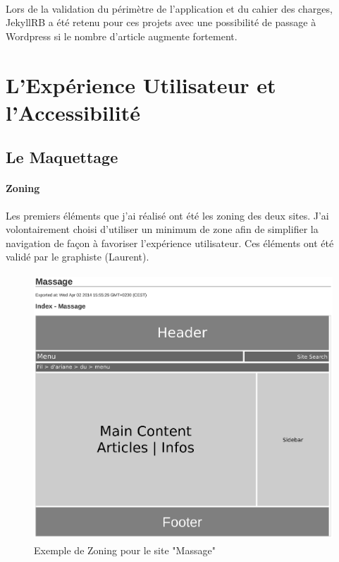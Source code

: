 \documentclass[11pt,a4paper]{report}
\begin{document}
		\paragraph*{}Lors de la validation du périmètre de l'application et du cahier des charges, JekyllRB a été retenu pour ces projets avec une possibilité de passage à Wordpress si le nombre d'article augmente fortement.
		\newpage

	\section{L'Expérience Utilisateur et l'Accessibilité}
		\subsection{Le Maquettage}
			\paragraph*{Zoning}Les premiers éléments que j'ai réalisé ont été les zoning des deux sites. J'ai volontairement choisi d'utiliser un minimum de zone afin de simplifier la navigation de façon à favoriser l'expérience utilisateur. Ces éléments ont été validé par le graphiste (Laurent).
				\begin{figure}[H]
					\centering
					\includegraphics[height=10cm]{Zone-Massage.eps}
					\caption{Exemple de Zoning pour le site "Massage"}
					\label{fig:Zoning Massage}
				\end{figure}
\end{document}
